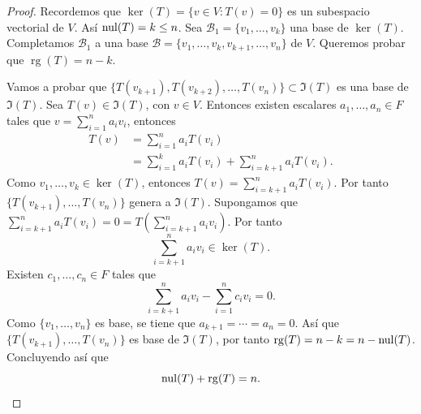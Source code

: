 \documentclass[12pt,a4paper]{book}
\newcommand{\rg}{\operatorname{rg}}
\newcommand{\llaves}[1]{\{#1\}}
\begin{document}
    \begin{proof}
        Recordemos que $\ker(T) = \llaves{v \in V: T(v) = 0}$ es un subespacio vectorial de $V$. Así $\operatorname{nul}(T) = k \leq n$. Sea $\mathcal{B}_{1} = \llaves{v_{1}, \dots , v_{k}}$ una base de $\ker(T)$. Completamos $\mathcal{B}_{1}$ a una base $\mathcal{B} = \llaves{v_{1}, \dots,v_{k}, v_{k + 1}, \dots , v_{n}}$ de $V$. Queremos probar que $\rg(T) = n - k$.

        Vamos a probar que $\llaves{T(v_{k + 1}),T(v_{k + 2}), \dots, T(v_{n})} \subset \Im(T)$ es una base de $\Im(T)$. Sea $T(v) \in \Im(T)$, con $v \in V$. Entonces existen escalares $a_{1}, \dots , a_{n} \in F$ tales que $v = \sum_{i = 1}^{n}a_{i}v_{i}$, entonces
        \begin{align*}
            T(v) & = \sum_{i = 1}^{n} a_{i} T(v_{i})\\
            & = \sum_{i = 1}^{k} a_{i} T(v_{i}) + \sum_{i = k + 1}^{n} a_{i} T(v_{i}).
        \end{align*}
        Como $v_{1}, \dots, v_{k} \in \ker(T)$, entonces $T(v) = \sum_{i = k + 1}^{n} a_{i} T(v_{i})$. Por tanto $\llaves{T(v_{k+1}), \dots, T(v_{n})}$ genera a $\Im(T)$. Supongamos que $\sum_{i = k+1}^{n} a_{i} T(v_{i}) = 0 = T\left(\sum_{i = k+1}^{n} a_{i} v_{i}\right)$. Por tanto
        \begin{equation*}
            \sum_{i = k+1}^{n} a_{i} v_{i} \in \ker(T).
        \end{equation*}
        Existen $c_{1}, \dots, c_{n} \in F$ tales que
        \begin{equation*}
            \sum_{i = k+1}^{n} a_{i} v_{i} - \sum_{i = 1}^{n} c_{i} v_{i} = 0.
        \end{equation*}
        Como $\llaves{v_{1}, \dots, v_{n}}$ es base, se tiene que $a_{k + 1} = \dotsi = a_{n} = 0$. Así que $\llaves{T(v_{k + 1}), \dots , T(v_{n})}$ es base de $\Im(T)$, por tanto $\rg(T) = n - k = n - \nul(T)$. Concluyendo así que
        \begin{equation*}
            \nul(T) + \rg(T) = n.
        \end{equation*}
    \end{proof}
\end{document}
